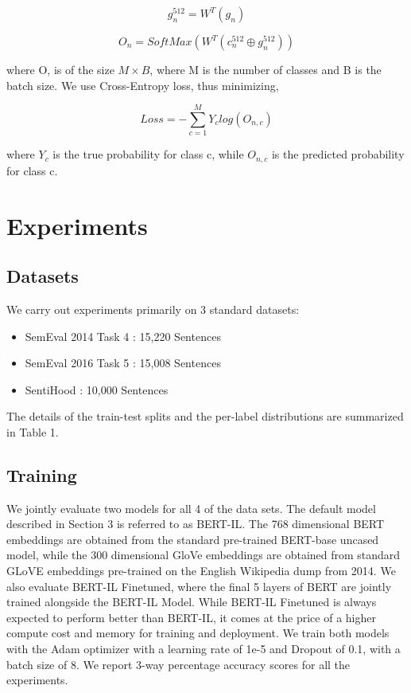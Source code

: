\documentclass[11pt,a4paper]{article}
\begin{document}
\begin{equation}
    g_{n}^{512} = W^{T}(g_{n}) 
\end{equation}

\begin{equation}
    O_{n} = SoftMax(W^{T}(c_{n}^{512} \oplus g_{n}^{512})) 
\end{equation}

where O, is of the size \(M \times B\), where M is the number of classes and B is the batch size. We use Cross-Entropy loss, thus minimizing,

\begin{equation}
    Loss = -\sum_{c=1}^{M} Y_{c}log(O_{n,c}) 
\end{equation}

where \(Y_{c}\) is the true probability for class c, while \(O_{n,c}\) is the predicted probability for class c. 

\section{Experiments}
\label{sec:length}


\subsection{Datasets}



We carry out experiments primarily on 3 standard datasets:

\begin{itemize}
    \item SemEval 2014 Task 4 \cite{pontiki-etal-2014-semeval}: 15,220 Sentences  
    \item SemEval 2016 Task 5 \cite{pontiki-etal-2016-semeval}: 15,008 Sentences
    \item SentiHood \cite{saeidi-etal-2016-sentihood}: 10,000 Sentences


\end{itemize}

The details of the train-test splits and the per-label distributions are summarized in Table 1. 
 \subsection{Training}
 
 We jointly evaluate two models for all 4 of the data sets. The default model described in Section 3 is referred to as BERT-IL. The 768 dimensional BERT embeddings are obtained from the standard pre-trained BERT-base uncased model, while the 300 dimensional GloVe embeddings are obtained from standard GLoVE embeddings pre-trained on the English Wikipedia dump from 2014. We also evaluate BERT-IL Finetuned, where the final 5 layers of BERT are jointly trained alongside the BERT-IL Model. While BERT-IL Finetuned is always expected to perform better than BERT-IL, it comes at the price of a higher compute cost and memory for training and deployment. We train both models with the Adam optimizer with a learning rate of 1e-5 and Dropout of 0.1, with a batch size of 8. We report 3-way percentage accuracy scores for all the experiments.
 
\end{document}
